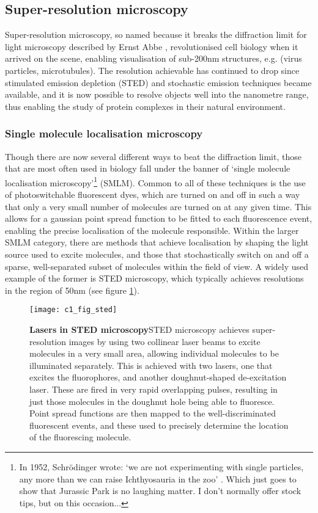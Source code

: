 \documentclass[a4paper,11pt,twoside,openright]{scrbook}
\begin{document}
\subsection{Super-resolution microscopy}
Super-resolution microscopy, so named because it breaks the diffraction limit for light microscopy described by Ernst Abbe \cite{Abbe1873}, revolutionised cell biology when it arrived on the scene, enabling visualisation of sub-200nm structures, e.g. (virus particles, microtubules). The resolution achievable has continued to drop since stimulated emission depletion \cite{Hell1994} (STED) and stochastic emission techniques \cite{Rust2006,Hess2006,Betzig2006} became available, and it is now possible to resolve objects well into the nanometre range, thus enabling the study of protein complexes in their natural environment.

\subsubsection{Single molecule localisation microscopy}
Though there are now several different ways to beat the diffraction limit, those that are most often used in biology fall under the banner of `single molecule localisation microscopy'\footnote{In 1952, Schrödinger wrote: `we are not experimenting with single particles, any more than we can raise Ichthyosauria in the zoo' \cite{Schrodinger1952}. Which just goes to show that Jurassic Park is no laughing matter. I don't normally offer stock tips, but on this occasion...} (SMLM). Common to all of these techniques is the use of photoswitchable fluorescent dyes, which are turned on and off in such a way that only a very small number of molecules are turned on at any given time. This allows for a gaussian point spread function to be fitted to each fluorescence event, enabling the precise localisation of the molecule responsible. Within the larger SMLM category, there are methods that achieve localisation by shaping the light source used to excite molecules, and those that stochastically switch on and off a sparse, well-separated subset of molecules within the field of view. A widely used example of the former is STED microscopy, which typically achieves resolutions in the region of 50nm (see figure \ref{figure:sted}).

\begin{figure}[h]
\fcapsideright
    {\caption[Lasers in STED microscopy]{\sffamily\textbf{Lasers in STED microscopy}\newline \small STED microscopy achieves super-resolution images by using two collinear laser beams to excite molecules in a very small area, allowing individual molecules to be illuminated separately. This is achieved with two lasers, one that excites the fluorophores, and another doughnut-shaped de-excitation laser. These are fired in very rapid overlapping pulses, resulting in just those molecules in the doughnut hole being able to fluoresce. Point spread functions are then mapped to the well-discriminated fluorescent events, and these used to precisely determine the location of the fluorescing molecule.}\label{figure:sted}}
    {\texttt{[image: c1\_fig\_sted]}}
\end{figure}
\end{document}
